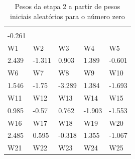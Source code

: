 \documentclass[11pt]{article}
\begin{document}
\begin{table}[h]
  \centering
  \caption{Pesos da etapa 2 a partir de pesos iniciais aleatórios para o número zero}
  \label{tab:wp0r_2}
  \begin{tabular}{lllll}
  \cellcolor[HTML]{000000}{\color[HTML]{FFFFFF} W0} &                            &                            &                            &                            \\
  -0.261                                            &                            &                            &                            &                            \\
  \rowcolor[HTML]{000000}
  {\color[HTML]{FFFFFF} W1}                         & {\color[HTML]{FFFFFF} W2}  & {\color[HTML]{FFFFFF} W3}  & {\color[HTML]{FFFFFF} W4}  & {\color[HTML]{FFFFFF} W5}  \\
  2.439                                             & -1.311                     & 0.903                      & 1.389                      & -0.601                     \\
  \rowcolor[HTML]{000000}
  {\color[HTML]{FFFFFF} W6}                         & {\color[HTML]{FFFFFF} W7}  & {\color[HTML]{FFFFFF} W8}  & {\color[HTML]{FFFFFF} W9}  & {\color[HTML]{FFFFFF} W10} \\
  1.546                                             & -1.75                      & -3.289                     & 1.384                      & -1.693                     \\
  \rowcolor[HTML]{000000}
  {\color[HTML]{FFFFFF} W11}                        & {\color[HTML]{FFFFFF} W12} & {\color[HTML]{FFFFFF} W13} & {\color[HTML]{FFFFFF} W14} & {\color[HTML]{FFFFFF} W15} \\
  0.985                                             & -0.57                      & 0.762                      & -1.903                     & -1.553                     \\
  \rowcolor[HTML]{000000}
  {\color[HTML]{FFFFFF} W16}                        & {\color[HTML]{FFFFFF} W17} & {\color[HTML]{FFFFFF} W18} & {\color[HTML]{FFFFFF} W19} & {\color[HTML]{FFFFFF} W20} \\
  2.485                                             & 0.595                      & -0.318                     & 1.355                      & -1.067                     \\
  \rowcolor[HTML]{000000}
  {\color[HTML]{FFFFFF} W21}                        & {\color[HTML]{FFFFFF} W22} & {\color[HTML]{FFFFFF} W23} & {\color[HTML]{FFFFFF} W24} & {\color[HTML]{FFFFFF} W25} \\

\end{tabular}
\end{table}
\end{document}
